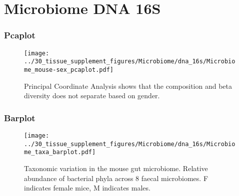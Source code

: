 \clearpage
\section{Microbiome DNA 16S}

\subsubsection{Pcaplot}
\begin{figure}[h]
\centering
\texttt{[image: ../30\_tissue\_supplement\_figures/Microbiome/dna\_16s/Microbiome\_mouse-sex\_pcaplot.pdf]}

\caption{Principal Coordinate Analysis shows that the composition and beta diversity does not separate based on gender.}
\end{figure}


\clearpage

\subsubsection{Barplot}
\begin{figure}[h]
\centering
\texttt{[image: ../30\_tissue\_supplement\_figures/Microbiome/dna\_16s/Microbiome\_taxa\_barplot.pdf]}

\caption{Taxonomic variation in the mouse gut microbiome. Relative abundance of bacterial phyla across 8 faecal microbiomes. F indicates female mice, M indicates males.
}
\end{figure}

